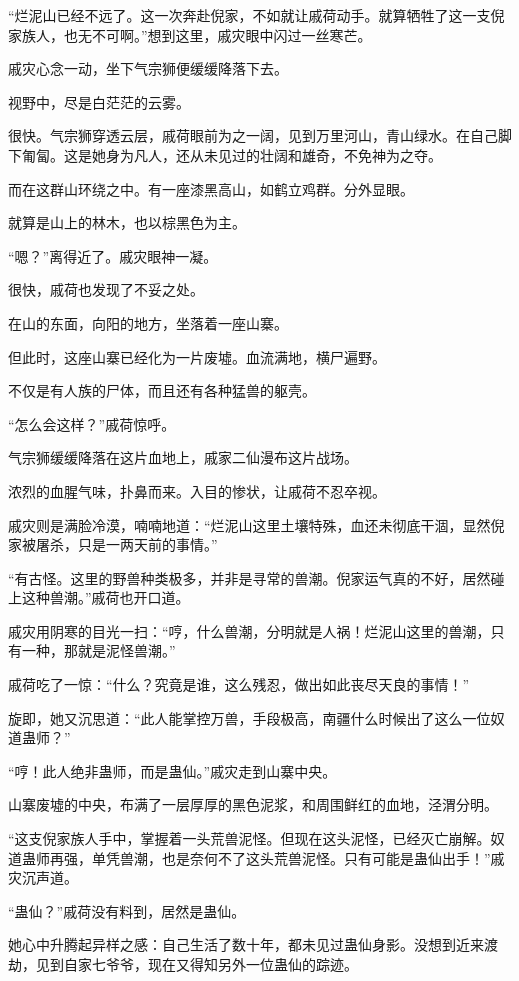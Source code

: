 \begin{this_body}
“烂泥山已经不远了。这一次奔赴倪家，不如就让戚荷动手。就算牺牲了这一支倪家族人，也无不可啊。”想到这里，戚灾眼中闪过一丝寒芒。

戚灾心念一动，坐下气宗狮便缓缓降落下去。

视野中，尽是白茫茫的云雾。

很快。气宗狮穿透云层，戚荷眼前为之一阔，见到万里河山，青山绿水。在自己脚下匍匐。这是她身为凡人，还从未见过的壮阔和雄奇，不免神为之夺。

而在这群山环绕之中。有一座漆黑高山，如鹤立鸡群。分外显眼。

就算是山上的林木，也以棕黑色为主。

“嗯？”离得近了。戚灾眼神一凝。

很快，戚荷也发现了不妥之处。

在山的东面，向阳的地方，坐落着一座山寨。

但此时，这座山寨已经化为一片废墟。血流满地，横尸遍野。

不仅是有人族的尸体，而且还有各种猛兽的躯壳。

“怎么会这样？”戚荷惊呼。

气宗狮缓缓降落在这片血地上，戚家二仙漫布这片战场。

浓烈的血腥气味，扑鼻而来。入目的惨状，让戚荷不忍卒视。

戚灾则是满脸冷漠，喃喃地道：“烂泥山这里土壤特殊，血还未彻底干涸，显然倪家被屠杀，只是一两天前的事情。”

“有古怪。这里的野兽种类极多，并非是寻常的兽潮。倪家运气真的不好，居然碰上这种兽潮。”戚荷也开口道。

戚灾用阴寒的目光一扫：“哼，什么兽潮，分明就是人祸！烂泥山这里的兽潮，只有一种，那就是泥怪兽潮。”

戚荷吃了一惊：“什么？究竟是谁，这么残忍，做出如此丧尽天良的事情！”

旋即，她又沉思道：“此人能掌控万兽，手段极高，南疆什么时候出了这么一位奴道蛊师？”

“哼！此人绝非蛊师，而是蛊仙。”戚灾走到山寨中央。

山寨废墟的中央，布满了一层厚厚的黑色泥浆，和周围鲜红的血地，泾渭分明。

“这支倪家族人手中，掌握着一头荒兽泥怪。但现在这头泥怪，已经灭亡崩解。奴道蛊师再强，单凭兽潮，也是奈何不了这头荒兽泥怪。只有可能是蛊仙出手！”戚灾沉声道。

“蛊仙？”戚荷没有料到，居然是蛊仙。

她心中升腾起异样之感：自己生活了数十年，都未见过蛊仙身影。没想到近来渡劫，见到自家七爷爷，现在又得知另外一位蛊仙的踪迹。


\end{this_body}
